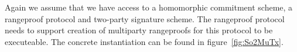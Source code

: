 Again we assume that we have access to a homomorphic commitment scheme, a rangeproof protocol and two-party signature scheme. The rangeproof protocol needs to support creation
of multiparty rangeproofs for this protocol to be executeable. The concrete instantiation can be found in figure~\ref{fig:So2MuTx}.
\begin{figure}
    \begin{center}
\end{center}
\end{figure}
